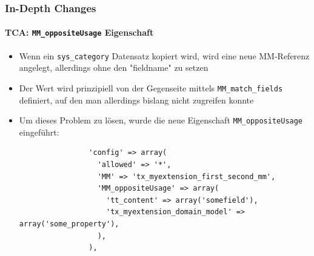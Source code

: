 \begin{frame}[fragile]
	\frametitle{In-Depth Changes}
	\framesubtitle{TCA: \texttt{MM\_oppositeUsage} Eigenschaft}

	\lstset{
		basicstyle=\tiny\ttfamily
	}

	\begin{itemize}
		\item Wenn ein \texttt{sys\_category} Datensatz kopiert wird, wird eine neue MM-Referenz angelegt, allerdings
ohne den "fieldname" zu setzen
		\item Der Wert wird prinzipiell von der Gegenseite mittels \texttt{MM\_match\_fields} definiert, auf den man allerdings bislang nicht zugreifen konnte
		\item Um dieses Problem zu lösen, wurde die neue Eigenschaft \texttt{MM\_oppositeUsage} eingeführt:

			\begin{lstlisting}
				'config' => array(
				  'allowed' => '*',
				  'MM' => 'tx_myextension_first_second_mm',
				  'MM_oppositeUsage' => array(
				    'tt_content' => array('somefield'),
				    'tx_myextension_domain_model' => array('some_property'),
				  ),
				),
			\end{lstlisting}

	\end{itemize}

\end{frame}


